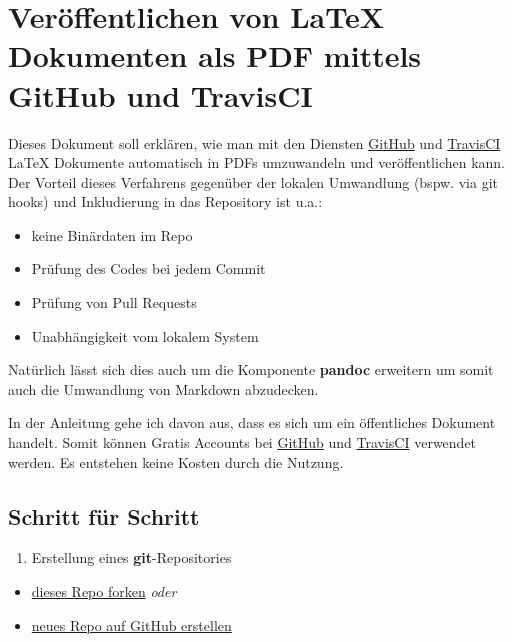 \documentclass[]{article}
\date{}
\providecommand{\tightlist}{%
  \setlength{\itemsep}{0pt}\setlength{\parskip}{0pt}}
\begin{document}
\section{Veröffentlichen von LaTeX Dokumenten als PDF mittels GitHub und
TravisCI}\label{veruxf6ffentlichen-von-latex-dokumenten-als-pdf-mittels-github-und-travisci}

Dieses Dokument soll erklären, wie man mit den Diensten
\href{https://github.com/}{GitHub} und
\href{https://travis-ci.org/}{TravisCI} LaTeX Dokumente automatisch in
PDFs umzuwandeln und veröffentlichen kann. Der Vorteil dieses Verfahrens
gegenüber der lokalen Umwandlung (bspw. via git hooks) und Inkludierung
in das Repository ist u.a.:

\begin{itemize}
\tightlist
\item
  keine Binärdaten im Repo
\item
  Prüfung des Codes bei jedem Commit
\item
  Prüfung von Pull Requests
\item
  Unabhängigkeit vom lokalem System
\end{itemize}

Natürlich lässt sich dies auch um die Komponente \textbf{pandoc}
erweitern um somit auch die Umwandlung von Markdown abzudecken.

In der Anleitung gehe ich davon aus, dass es sich um ein öffentliches
Dokument handelt. Somit können Gratis Accounts bei
\href{https://github.com/}{GitHub} und
\href{https://travis-ci.org/}{TravisCI} verwendet werden. Es entstehen
keine Kosten durch die Nutzung.

\subsection{Schritt für Schritt}\label{schritt-fuxfcr-schritt}

\begin{enumerate}
\def\labelenumi{\arabic{enumi}.}
\tightlist
\item
  Erstellung eines \textbf{git}-Repositories
\end{enumerate}

\begin{itemize}
\tightlist
\item
  \href{https://github.com/SimonWaldherr/golang-examples\#fork-destination-box}{dieses
  Repo forken} \emph{oder}
\item
  \href{https://github.com/new}{neues Repo auf GitHub erstellen}
\end{itemize}
\end{document}
